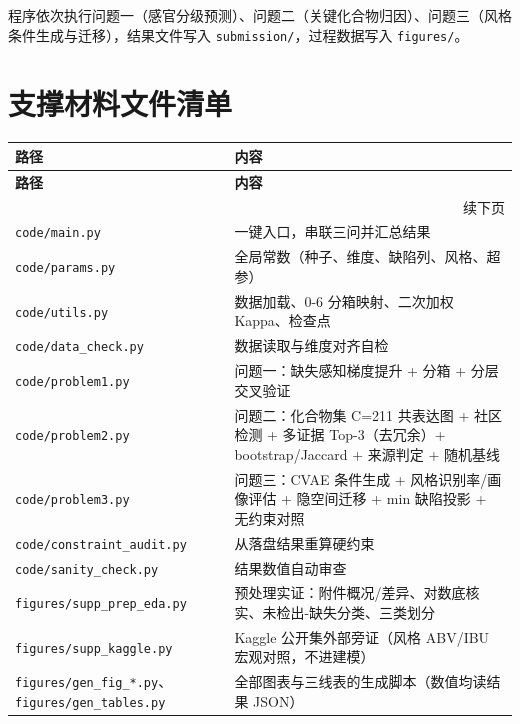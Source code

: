 \documentclass[zihao=-4,a4paper,UTF8,fontset=none]{ctexart}
\begin{document}
程序依次执行问题一（感官分级预测）、问题二（关键化合物归因）、问题三（风格条件生成与迁移），结果文件写入 \texttt{submission/\allowbreak{}}，过程数据写入 \texttt{figures/\allowbreak{}}。

\section{支撑材料文件清单}

{\small
\begin{longtable}{@{}p{}p{}@{}}
\toprule
\textbf{路径} & \textbf{内容} \\ \midrule
\endfirsthead
\toprule
\textbf{路径} & \textbf{内容} \\ \midrule
\endhead
\bottomrule
\multicolumn{2}{r}{\small 续下页} \\
\endfoot
\bottomrule
\endlastfoot
\texttt{code/\allowbreak{}main.py} & 一键入口，串联三问并汇总结果 \\
\texttt{code/\allowbreak{}params.py} & 全局常数（种子、维度、缺陷列、风格、超参） \\
\texttt{code/\allowbreak{}utils.py} & 数据加载、0-6 分箱映射、二次加权 Kappa、检查点 \\
\texttt{code/data\_\allowbreak{}check.py} & 数据读取与维度对齐自检 \\
\texttt{code/\allowbreak{}problem1.py} & 问题一：缺失感知梯度提升 + 分箱 + 分层交叉验证 \\
\texttt{code/\allowbreak{}problem2.py} & 问题二：化合物集 C=211 共表达图 + 社区检测 + 多证据 Top-3（去冗余）+ bootstrap/Jaccard + 来源判定 + 随机基线 \\
\texttt{code/\allowbreak{}problem3.py} & 问题三：CVAE 条件生成 + 风格识别率/画像评估 + 隐空间迁移 + min 缺陷投影 + 无约束对照 \\
\texttt{code/constraint\_\allowbreak{}audit.py} & 从落盘结果重算硬约束 \\
\texttt{code/sanity\_\allowbreak{}check.py} & 结果数值自动审查 \\
\texttt{figures/supp\_\allowbreak{}prep\_\allowbreak{}eda.py} & 预处理实证：附件概况/差异、对数底核实、未检出-缺失分类、三类划分 \\
\texttt{figures/supp\_\allowbreak{}kaggle.py} & Kaggle 公开集外部旁证（风格 ABV/IBU 宏观对照，不进建模） \\
\texttt{figures/gen\_\allowbreak{}fig\_\allowbreak{}*.py}、\texttt{figures/gen\_\allowbreak{}tables.py} & 全部图表与三线表的生成脚本（数值均读结果 JSON） \\

\end{longtable}}
\end{document}
